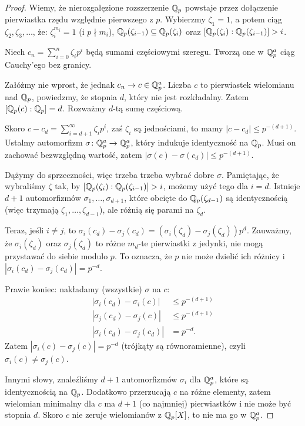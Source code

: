 \begin{proof}
	Wiemy, że nierozgałęzione rozszerzenie $\mathbb Q_p$ powstaje przez dołączenie pierwiastka rzędu względnie pierwszego z $p$.
	Wybierzmy $\zeta_1 = 1$, a potem ciąg $\zeta_2, \zeta_3, \dots$, że: $\zeta_i^{m_i} = 1$ (i $p \nmid m_i$), $\mathbb Q_p(\zeta_{i-1}) \subseteq \mathbb Q_p(\zeta_i)$ oraz $[\mathbb Q_p(\zeta_i) : \mathbb Q_p(\zeta_{i-1})] > i$.

	Niech $c_n =\sum_{i=0}^n \zeta_i p^i$ będą sumami częściowymi szeregu.
	Tworzą one w $\mathbb Q_p^a$ ciąg Cauchy'ego bez granicy.
	
	Załóżmy nie wprost, że jednak $c_n \to c \in \mathbb Q_p^a$.
	Liczba $c$ to pierwiastek wielomianu nad $\mathbb Q_p$, powiedzmy, że stopnia $d$, który nie jest rozkładalny.
	Zatem $[\mathbb Q_p(c) : \mathbb Q_p] = d$.
	Rozważmy $d$-tą sumę częściową.

	Skoro $c - c_d = \sum_{i=d+1}^\infty \zeta_i p^i$, zaś $\zeta_i$ są jednościami, to mamy $|c - c_d| \le p^{-(d+1)}$.
	Ustalmy automorfizm $\sigma \colon {\mathbb Q}^a_p \to {\mathbb Q}_p^a$, który indukuje identyczność na $\mathbb Q_p$.
	Musi on zachować bezwzględną wartość, zatem $|\sigma(c) - \sigma(c_d) | \le p^{-(d+1)}$.

	Dążymy do sprzeczności, więc trzeba trzeba wybrać dobre $\sigma$.
	Pamiętając, że wybraliśmy $\zeta$ tak, by $[\mathbb Q_p (\zeta_i) : \mathbb Q_p(\zeta_{i-1})] >i$, możemy użyć tego dla  $i=d$.
	Istnieje $d+1$ automorfizmów $\sigma_1, \dots, \sigma_{d+1}$, które obcięte do $\mathbb Q_p(\zeta_{d-1})$ są identycznością (więc trzymają $\zeta_1, \dots, \zeta_{d-1}$), ale różnią się parami na $\zeta_d$.

	Teraz, jeśli $i \neq j$, to $\sigma_i(c_d) - \sigma_j(c_d) = (\sigma_i(\zeta_d) - \sigma_j(\zeta_d))p^d$. 
	Zauważmy, że $\sigma_i(\zeta_d)$ oraz $\sigma_j(\zeta_d)$ to różne $m_d$-te pierwiastki z jedynki, nie mogą przystawać do siebie modulo $p$.
	To oznacza, że $p$ nie może dzielić ich różnicy i $|\sigma_i(c_d) - \sigma_j(c_d)| = p^{-d}$.

	Prawie koniec: nakładamy (wszystkie) $\sigma$ na $c$:
	\begin{align*}
		|\sigma_i(c_d) - \sigma_i(c)| & \le p^{-(d+1)} \\
		|\sigma_j(c_d) - \sigma_j(c)| & \le p^{-(d+1)} \\
		|\sigma_i(c_d) - \sigma_j(c_d)| & = p^{-d}.
	\end{align*}
	Zatem $|\sigma_i(c) - \sigma_j(c)| = p^{-d}$ (trójkąty są równoramienne), czyli $\sigma_i (c) \neq \sigma_j(c)$.

	Innymi słowy, znaleźliśmy $d+1$ automorfizmów $\sigma_i$ dla ${\mathbb Q}^a_p$, które są identycznością na $\mathbb Q_p$.
	Dodatkowo przerzucają $c$ na różne elementy, zatem wielomian minimalny dla $c$ ma $d+1$ (co najmniej) pierwiastków i nie może być stopnia $d$.
	Skoro $c$ nie zeruje wielomianów z $\mathbb Q_p[X]$, to nie ma go w $\mathbb Q_p^a$.
\end{proof}

